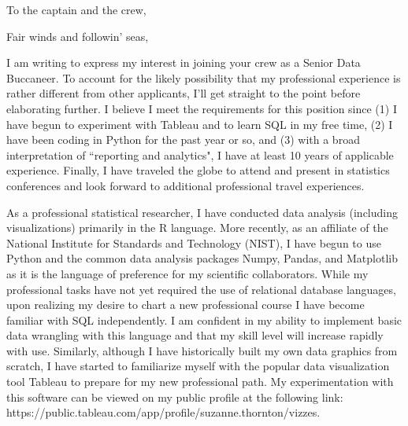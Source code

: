 \documentclass[11pt,a4paper,sans]{moderncv}
\begin{document}
	
	\date{\today}
	\opening{To the captain and the crew, \vspace{2mm}}
	\closing{\vspace{5mm} Fair winds and followin' seas,}
	\makelettertitle

I am writing to express my interest in joining your crew as a Senior Data Buccaneer. To account for the likely possibility that my professional experience is rather different from other applicants, I'll get straight to the point before elaborating further. I believe I meet the requirements for this position since (1) I have begun to experiment with Tableau and to learn SQL in my free time, (2) I have been coding in Python for the past year or so, and (3) with a broad interpretation of ``reporting and analytics", I have at least 10 years of applicable experience. Finally, I have traveled the globe to attend and present in statistics conferences and look forward to additional professional travel experiences. 


As a professional statistical researcher, I have conducted data analysis (including visualizations) primarily in the R language. More recently, as an affiliate of the National Institute for Standards and Technology (NIST), I have begun to use Python and the common data analysis packages Numpy, Pandas, and Matplotlib as it is the language of preference for my scientific collaborators. While my professional tasks have not yet required the use of relational database languages, upon realizing my desire to chart a new professional course I have become familiar with SQL independently. I am confident in my ability to implement basic data wrangling with this language and that my skill level will increase rapidly with use. Similarly, although I have historically built my own data graphics from scratch, I have started to familiarize myself with the popular data visualization tool Tableau to prepare for my new professional path. My experimentation with this software can be viewed on my public profile at the following link: https://public.tableau.com/app/profile/suzanne.thornton/vizzes. 
\end{document}
